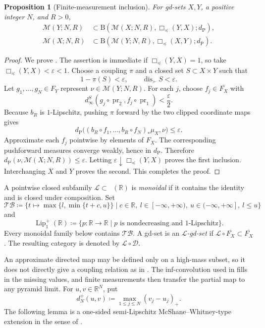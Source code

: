 \documentclass{amsart}
\theoremstyle{plain}
\newtheorem{proposition}[theorem]{Proposition}
\theoremstyle{definition}
\theoremstyle{remark}
\newcommand{\R}{\mathbb{R}}
\newcommand{\D}{\mathcal{D}}
\newcommand{\M}{\mathcal{M}}
\renewcommand{\L}{\mathcal{L}}
\newcommand{\TB}{\mathcal{TB}}
\newcommand{\Lup}{\operatorname{Lip}^{+}_{1}(\R)}
\DeclareMathOperator{\lipone}{Lip_1}
\DeclareMathOperator{\dis}{dis}
\DeclareMathOperator{\pr}{pr}
\newcommand{\dpr}{d_{\operatorname{P}}}
\newcommand{\dinf}[1]{d^{#1}_{\infty}}
\begin{document}
\begin{proposition}[Finite-measurement inclusion]
\label{prop:unilateral-box-measurement-inclusion}
For gd-sets $X,Y$, a positive integer $N$, and $R>0$,
\begin{align}
\M(Y;N,R)&\subset
\mathrm B(\M(X;N,R),\Box_{\preceq}(Y,X);\dpr),
\label{eq:unilateral-measurement-inclusion-forward}\\
\M(X;N,R)&\subset
\mathrm B(\M(Y;N,R),\Box_{\preceq}(X,Y);\dpr).
\label{eq:unilateral-measurement-inclusion-backward}
\end{align}
\end{proposition}

\begin{proof}
We prove .  The assertion
is immediate if $\Box_{\preceq}(Y,X)=1$, so take
$\Box_{\preceq}(Y,X)<\varepsilon<1$.  Choose a coupling $\pi$ and a closed
set $S\subset X\times Y$ such that
\[
1-\pi(S)<\varepsilon,\qquad\dis_{\succ}S<\varepsilon.
\]
Let $g_1,\ldots,g_N\in F_Y$ represent
$\nu\in\M(Y;N,R)$.  For each $j$, choose
$f_j\in\overline{F_X}$ with
\[
\dinf{S}(g_j\circ\pr_2,f_j\circ\pr_1)<\frac\varepsilon2.
\]
Because $b_R$ is $1$-Lipschitz, pushing $\pi$ forward by the two clipped
coordinate maps gives
\[ \dpr\bigl((b_R\circ f_1,\ldots,b_R\circ f_N)_*\mu_X,\nu\bigr) \leq\varepsilon. \]
Approximate each $f_j$ pointwise by elements of $F_X$.  The corresponding
pushforward measures converge weakly, hence in $\dpr$.  Therefore
$\dpr(\nu,\M(X;N,R))\leq\varepsilon$.  Letting
$\varepsilon\downarrow\Box_{\preceq}(Y,X)$ proves the first inclusion.
Interchanging $X$ and $Y$ proves the second.  This completes the proof.
\end{proof}

A pointwise closed subfamily $\L\subset\lipone(\R)$ is \emph{monoidal} if it
contains the identity and is closed under composition.  Set
\[
\TB\coloneqq\{t\mapsto\max\{l,\min\{t+c,u\}\}\mid
c\in\R,\ l\in[-\infty,+\infty),\ u\in(-\infty,+\infty],\ l\leq u\}
\]
and
\[ \Lup\coloneqq\{p\colon\R\to\R\mid p\text{ is nondecreasing and $1$-Lipschitz}\}. \]
Every monoidal family below contains $\TB$.  A gd-set is an
\emph{$\L$-gd-set} if
$\L\circ\overline{F_X}\subset\overline{F_X}$.  The resulting category is
denoted by $\L\circ\D$.

An approximate directed map may be defined only on a high-mass subset, so it
does not directly give a coupling relation as in
.  The inf-convolution used in
 fills in the missing values, and
finite measurements then transfer the partial map to any pyramid limit.
For $u,v\in\R^N$, put
\[
d_N^+(u,v)\coloneqq\max_{1\leq j\leq N}(v_j-u_j)_+.
\]
The following lemma is a one-sided semi-Lipschitz McShane--Whitney-type
extension in the sense of \cite{romaguera2000semi}.
\end{document}

